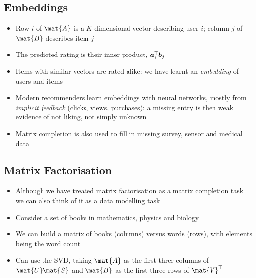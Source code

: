 
\begin{slide}
\section[-1]{Embeddings}

\begin{PauseHighLight}
  \begin{itemize}\squeeze
  \item Row $i$ of $\mat{A}$ is a $K$-dimensional vector describing
    user $i$; column $j$ of $\mat{B}$ describes item $j$\pause
  \item The predicted rating is their inner product,
    $\bm{a}_i^{\textsf{T}}\bm{b}_j$\pause
  \item Items with similar vectors are rated alike: we have learnt an
    \emph{embedding} of users and items\pause
  \item Modern recommenders learn embeddings with neural networks,
    mostly from \emph{implicit feedback} (clicks, views,
    purchases)\pause{}: a missing entry is then weak evidence of not
    liking, not simply unknown\pause
  \item Matrix completion is also used to fill in missing survey,
    sensor and medical data\pause
  \end{itemize}
\end{PauseHighLight}

\end{slide}

\Outline %

\begin{slide}
\section{Matrix Factorisation}

\begin{PauseHighLight}
  \begin{itemize}
  \item Although we have treated matrix factorisation as a matrix
    completion task we can also think of it as a data modelling
    task\pause
  \item Consider a set of books in mathematics, physics and biology\pause
  \item We can build a matrix of books (columns) versus words (rows),
    with elements being the word count\pause
  \item Can use the SVD, taking $\mat{A}$ as the first three columns of
    $\mat{U} \mat{S}$ and $\mat{B}$ as the first three rows of
    $\mat{V}^\tr$\pause
  \end{itemize}
\end{PauseHighLight}

\end{slide}

